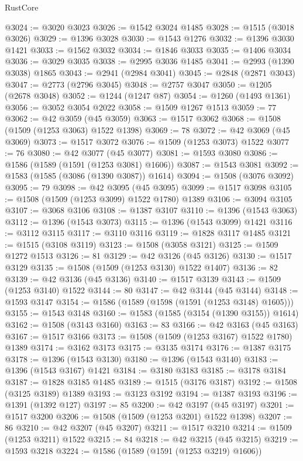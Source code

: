 \begin{lexlean}{RustCore}
\begin{coremodule}
@3024 := @3020 @3023
@3026 := @1542 @3024 @1485
@3028 := @1515 (@3018 @3026)
@3029 := @1396 @3028
@3030 := @1543 @1276
@3032 := @1396 @3030 @1421
@3033 := @1562 @3032
@3034 := @1846 @3033
@3035 := @1406 @3034
@3036 := @3029 @3035
@3038 := @2995 @3036 @1485
@3041 := @2993 (@1390 @3038) @1865
@3043 := @2941 (@2984 @3041)
@3045 := @2848 (@2871 @3043)
@3047 := @2773 (@2796 @3045)
@3048 := @2757 @3047
@3050 := @1205 (@2678 @3048)
@3052 := @1244 (@1247 @87)
@3054 := @1260 (@1493 @1361)
@3056 := @3052 @3054 @2022
@3058 := @1509 @1267 @1513
@3059 := 77
@3062 := @42 @3059 (@45 @3059)
@3063 := @1517 @3062
@3068 := @1508 (@1509 (@1253 @3063) @1522 @1398)
@3069 := 78
@3072 := @42 @3069 (@45 @3069)
@3073 := @1517 @3072
@3076 := @1509 (@1253 @3073) @1522
@3077 := 76
@3080 := @42 @3077 (@45 @3077)
@3081 := @1593 @3080
@3086 := @1586 (@1589 (@1591 (@1253 @3081) @1606))
@3087 := @1543 @3081
@3092 := @1583 (@1585 (@3086 (@1390 @3087)) @1614)
@3094 := @1508 (@3076 @3092)
@3095 := 79
@3098 := @42 @3095 (@45 @3095)
@3099 := @1517 @3098
@3105 := @1508 (@1509 (@1253 @3099) @1522 @1780) @1389
@3106 := @3094 @3105
@3107 := @3068 @3106
@3108 := @1387 @3107
@3110 := @1396 (@1543 @3063)
@3112 := @1396 (@1543 @3073)
@3115 := @1396 (@1543 @3099) @1421
@3116 := @3112 @3115
@3117 := @3110 @3116
@3119 := @1828 @3117 @1485
@3121 := @1515 (@3108 @3119)
@3123 := @1508 (@3058 @3121)
@3125 := @1509 @1272 @1513
@3126 := 81
@3129 := @42 @3126 (@45 @3126)
@3130 := @1517 @3129
@3135 := @1508 (@1509 (@1253 @3130) @1522 @1407)
@3136 := 82
@3139 := @42 @3136 (@45 @3136)
@3140 := @1517 @3139
@3143 := @1509 (@1253 @3140) @1522
@3144 := 80
@3147 := @42 @3144 (@45 @3144)
@3148 := @1593 @3147
@3154 := @1586 (@1589 (@1598 (@1591 (@1253 @3148) @1605)))
@3155 := @1543 @3148
@3160 := @1583 (@1585 (@3154 (@1390 @3155)) @1614)
@3162 := @1508 (@3143 @3160)
@3163 := 83
@3166 := @42 @3163 (@45 @3163)
@3167 := @1517 @3166
@3173 := @1508 (@1509 (@1253 @3167) @1522 @1780) @1389
@3174 := @3162 @3173
@3175 := @3135 @3174
@3176 := @1387 @3175
@3178 := @1396 (@1543 @3130)
@3180 := @1396 (@1543 @3140)
@3183 := @1396 (@1543 @3167) @1421
@3184 := @3180 @3183
@3185 := @3178 @3184
@3187 := @1828 @3185 @1485
@3189 := @1515 (@3176 @3187)
@3192 := @1508 (@3125 @3189) @1389
@3193 := @3123 @3192
@3194 := @1387 @3193
@3196 := @1391 (@1392 @127)
@3197 := 85
@3200 := @42 @3197 (@45 @3197)
@3201 := @1517 @3200
@3206 := @1508 (@1509 (@1253 @3201) @1522 @1398)
@3207 := 86
@3210 := @42 @3207 (@45 @3207)
@3211 := @1517 @3210
@3214 := @1509 (@1253 @3211) @1522
@3215 := 84
@3218 := @42 @3215 (@45 @3215)
@3219 := @1593 @3218
@3224 := @1586 (@1589 (@1591 (@1253 @3219) @1606))

\end{coremodule}
\end{lexlean}
